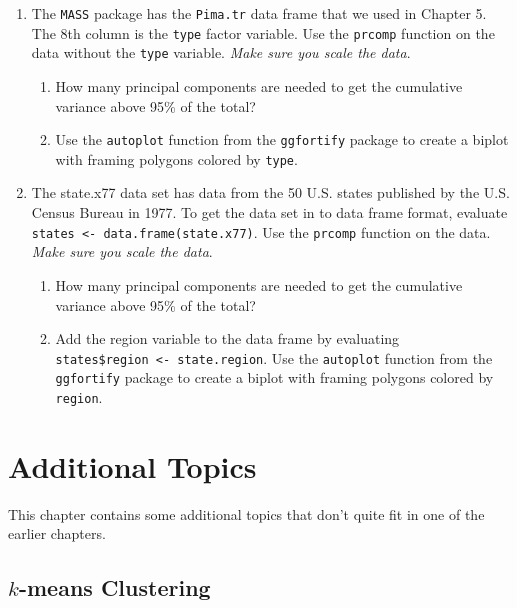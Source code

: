 \documentclass[
]{book}
\providecommand{\tightlist}{%
  \setlength{\itemsep}{0pt}\setlength{\parskip}{0pt}}
\theoremstyle{definition}
\theoremstyle{definition}
\theoremstyle{definition}
\theoremstyle{definition}
\theoremstyle{remark}
\begin{document}
\begin{enumerate}
\def\labelenumi{\arabic{enumi}.}
\setcounter{enumi}{22}
\tightlist
\item
  The \texttt{MASS} package has the \texttt{Pima.tr} data frame that we used in Chapter 5. The 8th column is the \texttt{type} factor variable. Use the \texttt{prcomp} function on the data without the \texttt{type} variable. \emph{Make sure you scale the data}.

  \begin{enumerate}
  \def\labelenumii{\alph{enumii}.}
  \tightlist
  \item
    How many principal components are needed to get the cumulative variance above 95\% of the total?
  \item
    Use the \texttt{autoplot} function from the \texttt{ggfortify} package to create a biplot with framing polygons colored by \texttt{type}.
  \end{enumerate}
\item
  The state.x77 data set has data from the 50 U.S. states published by the U.S. Census Bureau in 1977. To get the data set in to data frame format, evaluate \texttt{states\ \textless{}-\ data.frame(state.x77)}. Use the \texttt{prcomp} function on the data. \emph{Make sure you scale the data}.

  \begin{enumerate}
  \def\labelenumii{\alph{enumii}.}
  \tightlist
  \item
    How many principal components are needed to get the cumulative variance above 95\% of the total?
  \item
    Add the region variable to the data frame by evaluating \texttt{states\$region\ \textless{}-\ state.region}. Use the \texttt{autoplot} function from the \texttt{ggfortify} package to create a biplot with framing polygons colored by \texttt{region}.
  \end{enumerate}
\end{enumerate}

\chapter{Additional Topics}\label{additional-topics}

This chapter contains some additional topics that don't quite fit in one of the earlier chapters.

\section{\texorpdfstring{\(k\)-means Clustering}{k-means Clustering}}\label{k-means-clustering}
\end{document}
